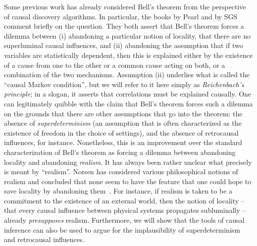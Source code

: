 \documentclass[12pt,onecolumn,nofootinbib]{revtex4-2}
\begin{document}
Some previous work has already considered Bell's theorem from the perspective of causal discovery algorithms.
In particular, the books by Pearl  \cite{Pearl2009} and by SGS \cite{Spirtes2001} comment briefly on the question. They both assert that Bell's theorem forces a dilemma between (i) abandoning a particular notion of locality, that there are no superluminal causal influences, and  
(ii) abandoning the assumption that if two variables are statistically dependent, then this is explained either by the existence of a cause from one to the other or a common cause acting on both, or a combination of the two mechanisms.  Assumption (ii) underlies what is called the ``causal Markov condition'', but we will refer to it here simply as \emph{Reichenbach's principle}; in a slogan, it asserts that correlations must be explained causally.  \color{black}
One can legitimately quibble with 
the claim that Bell's theorem forces such a dilemma
on the grounds that there are other assumptions that go into the theorem:  the absence of {\em superdeterminism} (an assumption that is often characterized as the existence of freedom in the choice of settings), and the absence of retrocausal influences, for instance.  
Nonetheless, this is an improvement over the standard characterization of Bell's theorem as forcing a dilemma between abandoning locality and abandoning \emph{realism}.  It has always been rather unclear what precisely is meant by ``realism''.  Norsen has considered various philosophical notions of realism and concluded that none seem to have the feature that one could hope to save locality by abandoning them~\cite{norsen2007against}.  For instance, if realism is taken to be a commitment to the existence of an external world, then the notion of locality -- that every causal influence between physical systems propagates subluminally -- already \emph{presupposes} realism.
Furthermore, we will show that the tools of causal inference can also be used to argue for the implausibility of superdeterminism and retrocausal influences.
\end{document}

